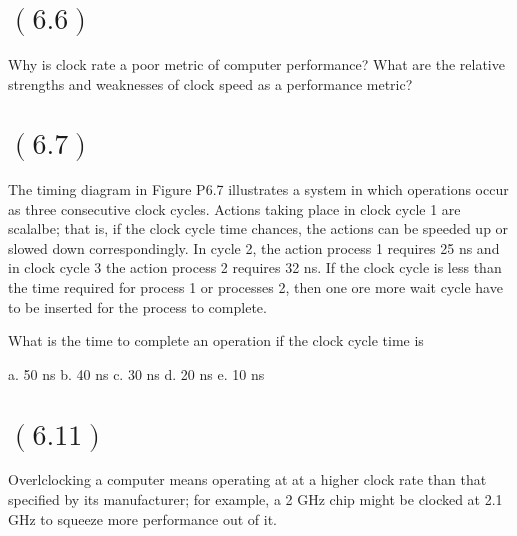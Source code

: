 \documentclass[letterpaper,12pt,titlepage]{article}
\begin{document}
\section*{$(6.6)$} Why is clock rate a poor metric of computer performance? What are the relative strengths and weaknesses of clock speed as a performance metric?

\begin{mdframed}[style=MyFrame]
\end{mdframed}

\section*{$(6.7)$} The timing diagram in Figure P6.7 illustrates a system in which operations occur as three consecutive clock cycles. Actions taking place in clock cycle 1 are scalalbe; that is, if the clock cycle time chances, the actions can be speeded up or slowed down correspondingly. In cycle 2, the action process 1 requires 25 ns and in clock cycle 3 the action process 2 requires 32 ns. If the clock cycle is less than the time required for process 1 or processes 2, then one ore more wait cycle have to be inserted for the process to complete.

What is the time to complete an operation if the clock cycle time is

a. 50 ns
b. 40 ns
c. 30 ns
d. 20 ns
e. 10 ns

\begin{mdframed}[style=MyFrame]
\end{mdframed}


\begin{mdframed}[style=MyFrame]
\end{mdframed}

\section*{$(6.11)$} Overlclocking a computer means operating at at a higher clock rate than that specified by its manufacturer; for example, a 2 GHz chip might be clocked at 2.1 GHz to squeeze more performance out of it.
\end{document}
